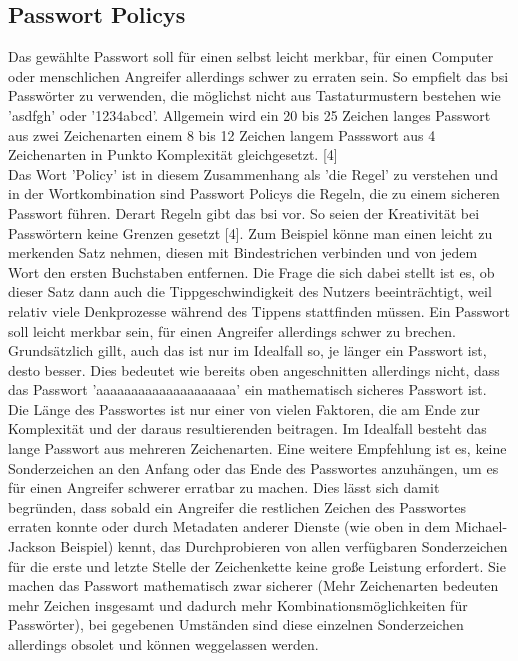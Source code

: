 \subsection{Passwort Policys}
Das gewählte Passwort soll für einen selbst leicht merkbar, für einen Computer oder menschlichen Angreifer allerdings schwer zu erraten sein. So empfielt das \ac{bsi} Passwörter zu verwenden, die möglichst nicht aus Tastaturmustern bestehen wie 'asdfgh' oder '1234abcd'. Allgemein wird ein 20 bis 25 Zeichen langes Passwort aus zwei Zeichenarten einem 8 bis 12 Zeichen langem Passswort aus 4 Zeichenarten in Punkto Komplexität gleichgesetzt. [4]\\
Das Wort 'Policy' ist in diesem Zusammenhang als 'die Regel' zu verstehen und in der Wortkombination sind Passwort Policys die Regeln, die zu einem sicheren Passwort führen. Derart Regeln gibt das \ac{bsi} vor. So seien der Kreativität bei Passwörtern keine Grenzen gesetzt [4]. Zum Beispiel könne man einen leicht zu merkenden Satz nehmen, diesen mit Bindestrichen verbinden und von jedem Wort den ersten Buchstaben entfernen. Die Frage die sich dabei stellt ist es, ob dieser Satz dann auch die Tippgeschwindigkeit des Nutzers beeinträchtigt, weil relativ viele Denkprozesse während des Tippens stattfinden müssen. Ein Passwort soll leicht merkbar sein, für einen Angreifer allerdings schwer zu brechen. Grundsätzlich gillt, auch das ist nur im Idealfall so, je länger ein Passwort ist, desto besser. Dies bedeutet wie bereits oben angeschnitten allerdings nicht, dass das Passwort 'aaaaaaaaaaaaaaaaaaaa' ein mathematisch sicheres Passwort ist. Die Länge des Passwortes ist nur einer von vielen Faktoren, die am Ende zur Komplexität und der daraus resultierenden beitragen. Im Idealfall besteht das lange Passwort aus mehreren Zeichenarten. Eine weitere Empfehlung ist es, keine Sonderzeichen an den Anfang oder das Ende des Passwortes anzuhängen, um es für einen Angreifer schwerer erratbar zu machen. Dies lässt sich damit begründen, dass sobald ein Angreifer die restlichen Zeichen des Passwortes erraten konnte oder durch Metadaten anderer Dienste (wie oben in dem Michael-Jackson Beispiel) kennt, das Durchprobieren von allen verfügbaren Sonderzeichen für die erste und letzte Stelle der Zeichenkette keine große Leistung erfordert. Sie machen das Passwort mathematisch zwar sicherer (Mehr Zeichenarten bedeuten mehr Zeichen insgesamt und dadurch mehr Kombinationsmöglichkeiten für Passwörter), bei gegebenen Umständen sind diese einzelnen Sonderzeichen allerdings obsolet und können weggelassen werden.
